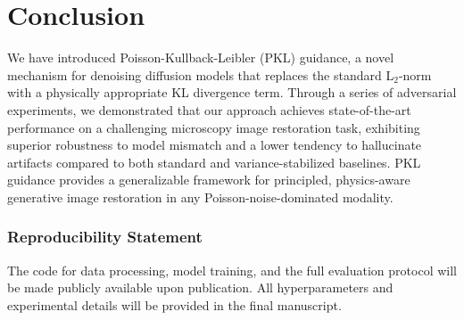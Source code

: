 \documentclass{article}
\begin{document}
\section{Conclusion}
\label{sec:conclusion}
We have introduced Poisson-Kullback-Leibler (PKL) guidance, a novel mechanism for denoising diffusion models that replaces the standard L$_2$-norm with a physically appropriate KL divergence term. Through a series of adversarial experiments, we demonstrated that our approach achieves state-of-the-art performance on a challenging microscopy image restoration task, exhibiting superior robustness to model mismatch and a lower tendency to hallucinate artifacts compared to both standard and variance-stabilized baselines. PKL guidance provides a generalizable framework for principled, physics-aware generative image restoration in any Poisson-noise-dominated modality.

\subsubsection*{Reproducibility Statement}
The code for data processing, model training, and the full evaluation protocol will be made publicly available upon publication. All hyperparameters and experimental details will be provided in the final manuscript.



\end{document}
